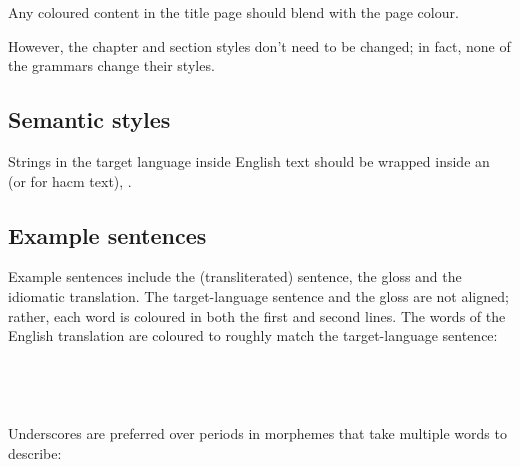 \documentclass{book}
\begin{document}
Any coloured content in the title page should blend with the page colour.

However, the chapter and section styles don't need to be changed; in fact, none of the grammars change their styles.

\subsection{Semantic styles}

Strings in the target language inside English text should be wrapped inside an \texttt{} (or \texttt{} for hacm text), .

\subsection{Example sentences}

Example sentences include the (transliterated) sentence, the gloss and the idiomatic translation. The target-language sentence and the gloss are not aligned; rather, each word is coloured in both the first and second lines. The words of the English translation are coloured to roughly match the target-language sentence: \\
~\\
 \\
     \\
     \\

Underscores are preferred over periods in morphemes that take multiple words to describe:
~\\
 \\
       \hlviii{$>$} \\
      \\
\end{document}
